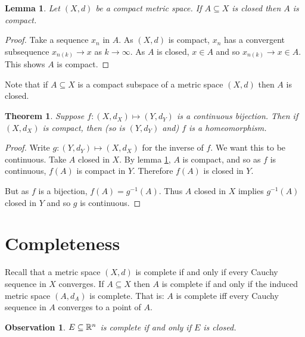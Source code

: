 \documentclass{notes}
\theoremstyle{plain}
\newtheorem{theorem}[proposition]{Theorem}
\newtheorem{observation}[proposition]{Observation}
\newtheorem{lemma}[proposition]{Lemma}
\begin{document}
\begin{lemma}
\label{homeomorphismlemma}
Let $ (X,d) $ be a compact metric space.  If $ A \subseteq X $ is
closed then $A$ is compact.
\end{lemma}

\begin{proof}
Take a sequence $ x_{n} $ in $ A $. As $ (X,d) $ is compact, $ 
x_{n}  $ has a convergent subsequence
$x_{n(k)}\to x$ as $ k \to \infty $.
As $ A $ is closed, $ x \in A $ and so $ x_{n(k)}\to x \in A $.
This shows $ A $ is compact.
\end{proof}

Note that if $ A \subseteq X $ is a compact subspace of a metric space
$ (X,d) $ then $ A $ is closed.

\begin{theorem}
Suppose $ f\colon (X,d_{X}) \mapsto (Y,d_{Y}) $ is a continuous 
bijection. Then if $ (X,d_{X}) $ is compact, then (so is $ 
(Y,d_{Y}) $ and) $ f $ is a homeomorphism.
\end{theorem}

\begin{proof}
  Write $ g\colon (Y,d_{Y}) \mapsto (X,d_{X}) $ for the inverse of $ f
  $.  We want this to be continuous.  Take $ A $ closed in $ X $.  By
  lemma \ref{homeomorphismlemma}, $ A $ is compact, and so as $ f $ is
  continuous, $ f(A) $ is compact in $ Y $.  Therefore $ f(A) $ is
  closed in $ Y $.
  
  But as $ f $ is a bijection, $f(A) = g^{-1}(A)$.  Thus $ A $ closed
  in $ X$ implies $g^{-1}(A) $ closed in $ Y $ and so $ g $ is
  continuous.
\end{proof}

\section{Completeness}

Recall that a metric space $ (X,d) $ is complete if and only if every
Cauchy sequence in $ X $ converges.  If $ A \subseteq X $ then $ A $
is complete if and only if the induced metric space $ (A,d_{A}) $ is
complete.  That is: $ A $ is complete iff every Cauchy sequence in $ A
$ converges to a point of $ A $.

\begin{observation}
$ E \subseteq \mathbb{R}^{n} $ is complete if and only if $ E $ is closed.
\end{observation}
\end{document}
